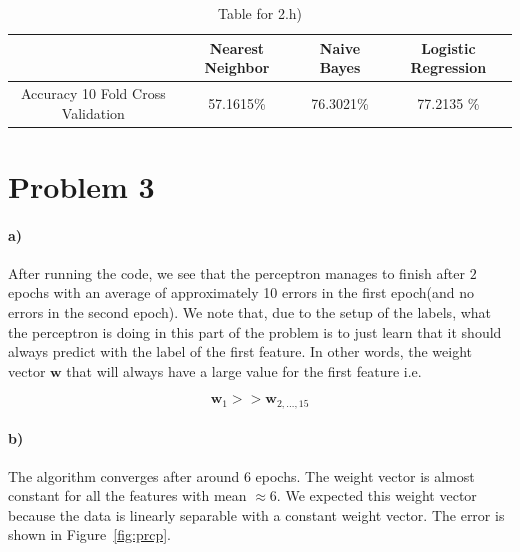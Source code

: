 \documentclass{article}
\begin{document}
\begin{table}[ht]
    \begin{center}
    \begin{tabular}{|c|c|c|c|}
   \hline
        & Nearest Neighbor & Naive Bayes & Logistic Regression \\ \hline
         Accuracy 10 Fold Cross Validation &  57.1615\%&76.3021\% &  77.2135 \%  \\ \hline
        \end{tabular}\caption{Table for 2.h)}
    \end{center}
\end{table}


\section{Problem 3}

\paragraph{a)}
After running the code, we see that the perceptron manages to finish after $2$ epochs with an average of approximately 10 errors in the first epoch(and no errors in the second epoch). We note that, due to the setup of the labels, what the perceptron is doing in this part of the problem is to just learn that it should always predict with the label of the first feature. In other words, the weight vector $\mathbf{w}$ that will always have a large value for the first feature i.e.

\[
\mathbf{w}_1 >> \mathbf{w}_{2,\hdots,15} 
\]

\paragraph{b)}

The algorithm converges after around $6$ epochs. The weight vector is almost constant for all the features with mean $\approx 6$. We expected this weight vector because the data is linearly separable with a constant weight vector. The error is shown in Figure~\ref{fig:prcp}.

\end{document}
